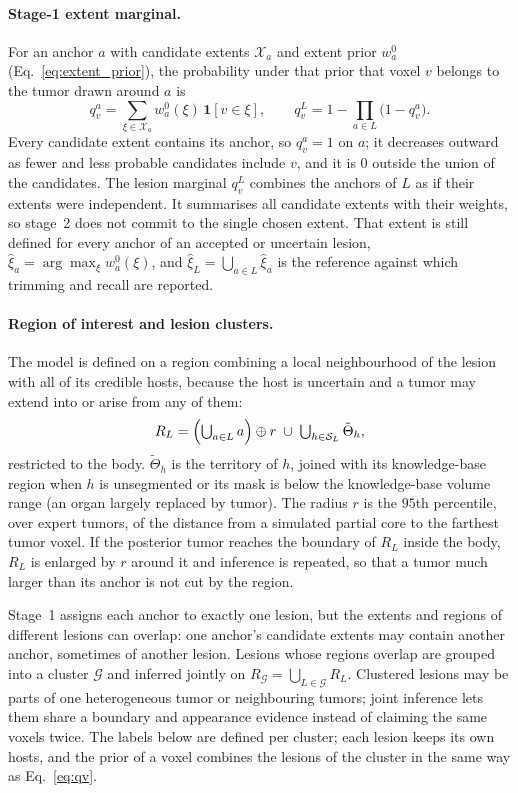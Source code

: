\documentclass[fleqn,10pt]{olplainarticle}
\begin{document}
\paragraph{Stage-1 extent marginal.} For an anchor $a$ with candidate extents $\mathcal{X}_a$ and extent prior $w^0_a$
(Eq.~\eqref{eq:extent_prior}), the probability under that prior that voxel $v$ belongs to the tumor drawn around $a$ is
\begin{equation}
\label{eq:qv}
q^a_v=\sum_{\xi\in\mathcal{X}_a}w^0_a(\xi)\,\mathbf{1}[v\in\xi],\qquad
q^L_v=1-\prod_{a\in L}\bigl(1-q^a_v\bigr).
\end{equation}
Every candidate extent contains its anchor, so $q^a_v=1$ on $a$; it decreases outward as fewer and less probable candidates
include $v$, and it is $0$ outside the union of the candidates. The lesion marginal $q^L_v$ combines the anchors of $L$ as if
their extents were independent. It summarises all candidate extents with their weights, so stage~2 does not commit to the
single chosen extent. That extent is still defined for every anchor of an accepted or uncertain lesion,
$\hat\xi_a=\arg\max_{\xi}w^0_a(\xi)$, and $\hat\xi_L=\bigcup_{a\in L}\hat\xi_a$ is the reference against which trimming and
recall are reported.

\paragraph{Region of interest and lesion clusters.} The model is defined on a region combining a local neighbourhood of the
lesion with all of its credible hosts, because the host is uncertain and a tumor may extend into or arise from any of them:
\begin{equation}
\label{eq:roi}
R_L=\Bigl(\textstyle\bigcup_{a\in L}a\Bigr)\oplus r\;\cup\;\bigcup_{h\in\mathcal{S}_L}\tilde\Theta_h ,
\end{equation}
restricted to the body. $\tilde\Theta_h$ is the territory of $h$, joined with its knowledge-base region when $h$ is
unsegmented or its mask is below the knowledge-base volume range (an organ largely replaced by tumor). The radius $r$ is the
$95$th percentile, over expert tumors, of the distance from a simulated partial core to the farthest tumor voxel. If the
posterior tumor reaches the boundary of $R_L$ inside the body, $R_L$ is enlarged by $r$ around it and inference is
repeated, so that a tumor much larger than its anchor is not cut by the region.

Stage~1 assigns each anchor to exactly one lesion, but the extents and regions of different lesions can overlap: one anchor's
candidate extents may contain another anchor, sometimes of another lesion. Lesions whose regions overlap are grouped into a
cluster $\mathcal{G}$ and inferred jointly on $R_\mathcal{G}=\bigcup_{L\in\mathcal{G}}R_L$. Clustered lesions may be parts of
one heterogeneous tumor or neighbouring tumors; joint inference lets them share a boundary and appearance evidence instead of
claiming the same voxels twice. The labels below are defined per cluster; each lesion keeps its own hosts, and the prior of
a voxel combines the lesions of the cluster in the same way as Eq.~\eqref{eq:qv}.
\end{document}
